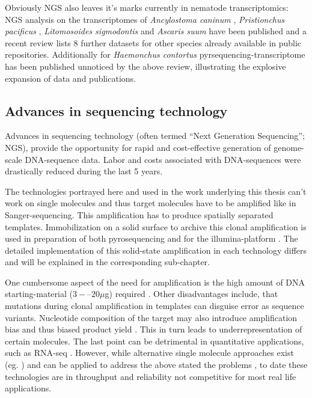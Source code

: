 Obviously NGS also leaves it's marks currently in nematode
transcriptomics: NGS analysis on the transcriptomes of
\textit{Ancylostoma caninum} \cite{pmid20470405}, \textit{Pristionchus
  pacificus} \cite{pmid20237107}, \textit{Litomosoides sigmodontis}
\cite{pmid20950480} and \textit{Ascaris suum} \cite{pmid21685128} have
been published and a recent review \cite{pmid22044053} lists 8 further
datasets for other species already available in public
repositories. Additionally for \textit{Haemonchus contortus}
pyrsequencing-transcriptome has been published \cite{pmid20420710}
unnoticed by the above review, illustrating the explosive expansion of
data and publications.

\subsection{Advances in sequencing technology}
\label{sec:ad-seq}

Advances in sequencing technology (often termed ``Next Generation
Sequencing''; NGS), provide the opportunity for rapid and
cost-effective generation of genome-scale DNA-sequence data. Labor
and costs associated with DNA-sequences were drastically reduced
during the last 5 years.



The technologies portrayed here and used in the work underlying this
thesis can't work on single molecules and thus target molecules have
to be amplified like in Sanger-sequencing. This amplification has to
produce spatially separated templates. Immobilization on a solid
surface to archive this clonal amplification is used in preparation of
both pyrosequencing and for the illumina-platform
\cite{pmid19997069}. The detailed implementation of this solid-state
amplification in each technology differs and will be explained in the
corresponding sub-chapter.

One cumbersome aspect of the need for amplification is the high amount
of DNA starting-material ($3 -– 20 \mu$g) required
\cite{pmid19997069}. Other disadvantages include, that mutations during
clonal amplification in templates can disguise error as sequence
variants. Nucleotide composition of the target may also introduce
amplification bias and thus biased product yield
\cite{pmid19327155}. This in turn leads to underrepresentation of
certain molecules. The last point can be detrimental in quantitative
applications, such as RNA-seq \cite{pmid19015660}. However, while
alternative single molecule approaches exist (eg. \cite{pmid21431759,
  pmid21572978}) and can be applied to address the above stated the
problems \cite{pmid21431761, pmid21957044}, to date these technologies
are in throughput and reliability not competitive for most real life
applications.



